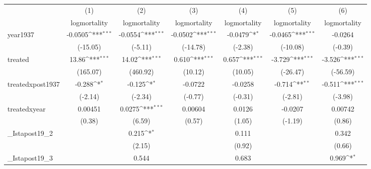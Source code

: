 {
\def\sym#1{\ifmmode^{#1}\else\(^{#1}\)\fi}
\begin{tabular}{l*{6}{c}}
\hline\hline
            &\multicolumn{1}{c}{(1)}&\multicolumn{1}{c}{(2)}&\multicolumn{1}{c}{(3)}&\multicolumn{1}{c}{(4)}&\multicolumn{1}{c}{(5)}&\multicolumn{1}{c}{(6)}\\
            &\multicolumn{1}{c}{logmortality}&\multicolumn{1}{c}{logmortality}&\multicolumn{1}{c}{logmortality}&\multicolumn{1}{c}{logmortality}&\multicolumn{1}{c}{logmortality}&\multicolumn{1}{c}{logmortality}\\
\hline
year1937    &     -0.0505\sym{***}&     -0.0554\sym{***}&     -0.0502\sym{***}&     -0.0479\sym{*}  &     -0.0465\sym{***}&     -0.0264         \\
            &    (-15.05)         &     (-5.11)         &    (-14.78)         &     (-2.38)         &    (-10.08)         &     (-0.39)         \\
[1em]
treated     &       13.86\sym{***}&       14.02\sym{***}&       0.610\sym{***}&       0.657\sym{***}&      -3.729\sym{***}&      -3.526\sym{***}\\
            &    (165.07)         &    (460.92)         &     (10.12)         &     (10.05)         &    (-26.47)         &    (-56.59)         \\
[1em]
treatedxpost1937&      -0.288\sym{*}  &      -0.125\sym{*}  &     -0.0722         &     -0.0258         &      -0.714\sym{**} &      -0.511\sym{***}\\
            &     (-2.14)         &     (-2.34)         &     (-0.77)         &     (-0.31)         &     (-2.81)         &     (-3.98)         \\
[1em]
treatedxyear&     0.00451         &      0.0275\sym{***}&     0.00604         &      0.0126         &     -0.0207         &     0.00742         \\
            &      (0.38)         &      (6.59)         &      (0.57)         &      (1.05)         &     (-1.19)         &      (0.86)         \\
[1em]
\_Istapost19\_2&                     &       0.215\sym{*}  &                     &       0.111         &                     &       0.342         \\
            &                     &      (2.15)         &                     &      (0.92)         &                     &      (0.66)         \\
[1em]
\_Istapost19\_3&                     &       0.544         &                     &       0.683         &                     &       0.969\sym{*}  \\

\end{tabular}}
